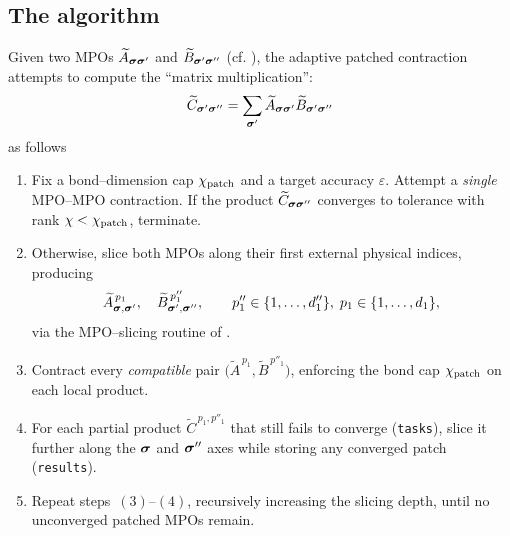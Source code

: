 \subsection{The algorithm}
Given two MPOs \(\widetilde{A}_{\boldsymbol{\sigma}\boldsymbol{\sigma}'}\) and \(\widetilde{B}_{\boldsymbol{\sigma}'\boldsymbol{\sigma}''}\) (cf. ), the adaptive patched contraction attempts to compute the ``matrix multiplication'':
\begin{equation}
    \widetilde{C}_{\boldsymbol{\sigma}'\boldsymbol{\sigma}''} = \sum_{\boldsymbol{\sigma}'} \widetilde{A}_{\boldsymbol{\sigma}\boldsymbol{\sigma}'} \widetilde{B}_{\boldsymbol{\sigma}'\boldsymbol{\sigma}''}
    \label{eq:genericAdaptiveMPOMPOContr}
\end{equation}
as follows
\begingroup
\renewcommand{\labelenumi}{(\arabic{enumi})}
\begin{enumerate}
    \item
  Fix a bond–dimension cap \(\chi_{\text{patch}}\) and a target accuracy \(\varepsilon\).  
  Attempt a \emph{single} MPO–MPO contraction.  
  If the product \(\widetilde{C}_{\boldsymbol{\sigma}\boldsymbol{\sigma}''}\) converges to tolerance with rank \(\chi<\chi_{\text{patch}}\), terminate.
\item Otherwise, slice both MPOs along their first external physical indices,
  producing
  \begin{equation}
    \widetilde{A}_{\boldsymbol{\sigma},\boldsymbol{\sigma}'}^{\,p_{1}},
    \quad
    \widetilde{B}_{\boldsymbol{\sigma}',\boldsymbol{\sigma}''}^{\,p''_{1}},
    \qquad
    p''_{1}\in\{1,\dots,d''_{1}\},
    \;
    p_{1}\in\{1,\dots,d_{1}\},
  \end{equation}
  via the MPO–slicing routine of .
    \item Contract every \emph{compatible} pair \(\bigl(\widetilde{A}^{\,p_{1}},
          \widetilde{B}^{\,p''_{1}}\bigr)\),
  enforcing the bond cap \(\chi_{\text{patch}}\) on each local product.
\item For each partial product
  \(\widetilde{C}^{\,p_{1},p''_{1}}\) that still fails to converge (\texttt{tasks}), slice it further along the \(\boldsymbol{\sigma}\) and \(\boldsymbol{\sigma}''\) axes while storing any converged patch (\texttt{results}).
\item Repeat steps~$(3)$–$(4)$, recursively increasing the slicing depth, until no unconverged patched MPOs remain.
\end{enumerate}
\endgroup

